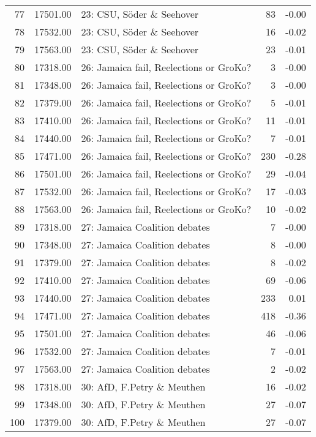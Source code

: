 \begin{table}[ht]
\begin{tabular}{rrlrr}
  77 & 17501.00 & 23: CSU, Söder \& Seehover &  83 & -0.00 \\ 
  78 & 17532.00 & 23: CSU, Söder \& Seehover &  16 & -0.02 \\ 
  79 & 17563.00 & 23: CSU, Söder \& Seehover &  23 & -0.01 \\ 
  80 & 17318.00 & 26: Jamaica fail, Reelections or GroKo? &   3 & -0.00 \\ 
  81 & 17348.00 & 26: Jamaica fail, Reelections or GroKo? &   3 & -0.00 \\ 
  82 & 17379.00 & 26: Jamaica fail, Reelections or GroKo? &   5 & -0.01 \\ 
  83 & 17410.00 & 26: Jamaica fail, Reelections or GroKo? &  11 & -0.01 \\ 
  84 & 17440.00 & 26: Jamaica fail, Reelections or GroKo? &   7 & -0.01 \\ 
  85 & 17471.00 & 26: Jamaica fail, Reelections or GroKo? & 230 & -0.28 \\ 
  86 & 17501.00 & 26: Jamaica fail, Reelections or GroKo? &  29 & -0.04 \\ 
  87 & 17532.00 & 26: Jamaica fail, Reelections or GroKo? &  17 & -0.03 \\ 
  88 & 17563.00 & 26: Jamaica fail, Reelections or GroKo? &  10 & -0.02 \\ 
  89 & 17318.00 & 27: Jamaica Coalition debates &   7 & -0.00 \\ 
  90 & 17348.00 & 27: Jamaica Coalition debates &   8 & -0.00 \\ 
  91 & 17379.00 & 27: Jamaica Coalition debates &   8 & -0.02 \\ 
  92 & 17410.00 & 27: Jamaica Coalition debates &  69 & -0.06 \\ 
  93 & 17440.00 & 27: Jamaica Coalition debates & 233 & 0.01 \\ 
  94 & 17471.00 & 27: Jamaica Coalition debates & 418 & -0.36 \\ 
  95 & 17501.00 & 27: Jamaica Coalition debates &  46 & -0.06 \\ 
  96 & 17532.00 & 27: Jamaica Coalition debates &   7 & -0.01 \\ 
  97 & 17563.00 & 27: Jamaica Coalition debates &   2 & -0.02 \\ 
  98 & 17318.00 & 30: AfD, F.Petry \& Meuthen &  16 & -0.02 \\ 
  99 & 17348.00 & 30: AfD, F.Petry \& Meuthen &  27 & -0.07 \\ 
  100 & 17379.00 & 30: AfD, F.Petry \& Meuthen &  27 & -0.07 \\ 

\end{tabular}
\end{table}
